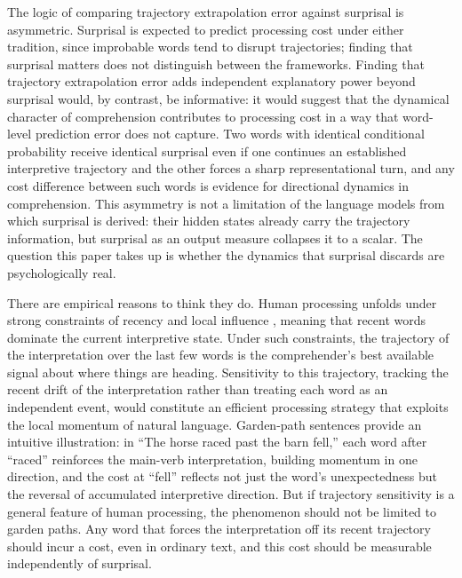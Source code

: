 \documentclass[12pt]{article}
\begin{document}
The logic of comparing trajectory extrapolation error against surprisal is asymmetric. Surprisal is expected to predict processing cost under either tradition, since improbable words tend to disrupt trajectories; finding that surprisal matters does not distinguish between the frameworks. Finding that trajectory extrapolation error adds independent explanatory power beyond surprisal would, by contrast, be informative: it would suggest that the dynamical character of comprehension contributes to processing cost in a way that word-level prediction error does not capture. Two words with identical conditional probability receive identical surprisal even if one continues an established interpretive trajectory and the other forces a sharp representational turn, and any cost difference between such words is evidence for directional dynamics in comprehension. This asymmetry is not a limitation of the language models from which surprisal is derived: their hidden states already carry the trajectory information, but surprisal as an output measure collapses it to a scalar. The question this paper takes up is whether the dynamics that surprisal discards are psychologically real.

There are empirical reasons to think they do. Human processing unfolds under strong constraints of recency and local influence \citep{gibson1998,lewis2005}, meaning that recent words dominate the current interpretive state. Under such constraints, the trajectory of the interpretation over the last few words is the comprehender's best available signal about where things are heading. Sensitivity to this trajectory, tracking the recent drift of the interpretation rather than treating each word as an independent event, would constitute an efficient processing strategy that exploits the local momentum of natural language. Garden-path sentences provide an intuitive illustration: in ``The horse raced past the barn fell,'' each word after ``raced'' reinforces the main-verb interpretation, building momentum in one direction, and the cost at ``fell'' reflects not just the word's unexpectedness but the reversal of accumulated interpretive direction. But if trajectory sensitivity is a general feature of human processing, the phenomenon should not be limited to garden paths. Any word that forces the interpretation off its recent trajectory should incur a cost, even in ordinary text, and this cost should be measurable independently of surprisal.
\end{document}
